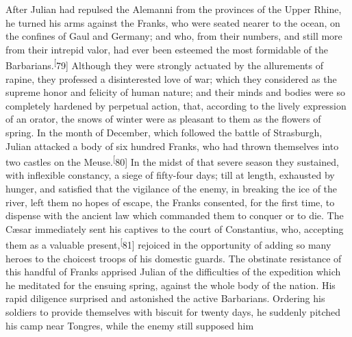 

After Julian had repulsed the Alemanni from the provinces of the
Upper Rhine, he turned his arms against the Franks, who were
seated nearer to the ocean, on the confines of Gaul and Germany;
and who, from their numbers, and still more from their intrepid
valor, had ever been esteemed the most formidable of the
Barbarians.\textsuperscript[79] Although they were strongly actuated by the
allurements of rapine, they professed a disinterested love of
war; which they considered as the supreme honor and felicity of
human nature; and their minds and bodies were so completely
hardened by perpetual action, that, according to the lively
expression of an orator, the snows of winter were as pleasant to
them as the flowers of spring. In the month of December, which
followed the battle of Strasburgh, Julian attacked a body of six
hundred Franks, who had thrown themselves into two castles on the
Meuse.\textsuperscript[80] In the midst of that severe season they sustained, with
inflexible constancy, a siege of fifty-four days; till at length,
exhausted by hunger, and satisfied that the vigilance of the
enemy, in breaking the ice of the river, left them no hopes of
escape, the Franks consented, for the first time, to dispense
with the ancient law which commanded them to conquer or to die.
The Cæsar immediately sent his captives to the court of
Constantius, who, accepting them as a valuable present,\textsuperscript[81]
rejoiced in the opportunity of adding so many heroes to the
choicest troops of his domestic guards. The obstinate resistance
of this handful of Franks apprised Julian of the difficulties of
the expedition which he meditated for the ensuing spring, against
the whole body of the nation. His rapid diligence surprised and
astonished the active Barbarians. Ordering his soldiers to
provide themselves with biscuit for twenty days, he suddenly
pitched his camp near Tongres, while the enemy still supposed him
